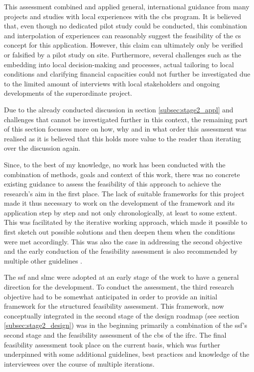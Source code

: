 This assessment combined and applied general, international guidance from many projects and studies with local experiences with the \acrshort{cbs} program. It is believed that, even though no dedicated pilot study could be conducted, this combination and interpolation of experiences can reasonably suggest the feasibility of the \acrshort{cs} concept for this application. However, this claim can ultimately only be verified or falsified by a pilot study on site. Furthermore, several challenges such as the embedding into local decision-making and processes, actual tailoring to local conditions and clarifying financial capacities could not further be investigated due to the limited amount of interviews with local stakeholders and ongoing developments of the superordinate project.\newline


Due to the already conducted discussion in section \ref{subsec:stage2_appl} and challenges that cannot be investigated further in this context, the remaining part of this section focusses more on how, why and in what order this assessment was realised as it is believed that this holds more value to the reader than iterating over the discussion again.\newline



Since, to the best of my knowledge, no work has been conducted with the combination of methods, goals and context of this work, there was no concrete existing guidance to assess the feasibility of this approach to achieve the research's aim in the first place. The lack of suitable frameworks for this project made it thus necessary to work on the development of the framework and its application step by step and not only chronologically, at least to some extent. This was facilitated by the iterative working approach, which made it possible to first sketch out possible solutions and then deepen them when the conditions were met accordingly. This was also the case in addressing the second objective and the early conduction of the feasibility assessment is also recommended by multiple other guidelines \autocite{citizenscience.govBasicStepsYour,garciaFindingWhatYou2021,ifrcCommunityBasedSurveillanceGuiding2017,ifrcFbFPractitionersManual2023b,minkmanCitizenScienceWater2015}.\newline


The \acrlong{ssf} and \acrlong{slmc} were adopted at an early stage of the work to have a general direction for the development. To conduct the assessment, the third research objective had to be somewhat anticipated in order to provide an initial framework for the structured feasibility assessment. This framework, now conceptually integrated in the second stage of the design roadmap (see section \ref{subsec:stage2_design}) was in the beginning primarily a combination of the \acrshort{ssf}'s second stage and the feasibility assessment of the \acrshort{cbs} of the \acrshort{ifrc}. The final feasibility assessment took place on the current basis, which was further underpinned with some additional guidelines, best practices and knowledge of the interviewees over the course of multiple iterations.\newline


